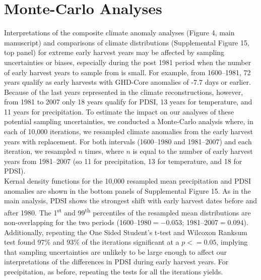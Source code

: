 \documentclass[12pt]{article}
\begin{document}
\section*{Monte-Carlo Analyses}
\noindent Interpretations of the composite climate anomaly analyses (Figure 4, main manuscript) and comparisons of climate distributions (Supplemental Figure 15, top panel) for extreme early harvest years may be affected by sampling uncertainties or biases, especially during the post 1981 period when the number of early harvest years to sample from is small. For example, from 1600--1981, 72 years qualify as early harvests with GHD-Core anomalies of -7.7 days or earlier. Because of the last years represented in the climate reconstructions, however, from 1981 to 2007 only 18 years qualify for PDSI, 13 years for temperature, and 11 years for precipitation. To estimate the impact on our analyses of these potential sampling uncertainties, we conducted a Monte-Carlo analysis where, in each of 10,000 iterations, we resampled climate anomalies from the early harvest years with replacement. For both intervals (1600--1980 and 1981--2007) and each iteration, we resampled $n$ times, where $n$ is equal to the number of early harvest years from 1981--2007 (so 11 for precipitation, 13 for temperature, and 18 for PDSI).\\
\indent Kernal density functions for the 10,000 resampled mean precipitation and PDSI anomalies are shown in the bottom panels of Supplemental Figure 15. As in the main analysis, PDSI shows the strongest shift with early harvest dates before and after 1980. The 1\textsuperscript{st} and 99\textsuperscript{th} percentiles of the resampled mean distributions are non-overlapping for the two periods (1600--1980$=-0.053$; 1981--2007$=0.094$). Additionally, repeating the One Sided Student's t-test and Wilcoxon Ranksum test found 97\% and 93\% of the iterations significant at a $p<=0.05$, implying that sampling uncertainties are unlikely to be large enough to affect our interpretations of the differences in PDSI during early harvest years. For precipitation, as before, repeating the tests for all the iterations yields.


\end{document}
